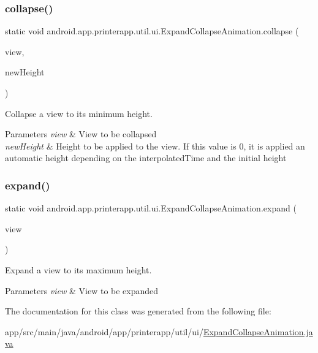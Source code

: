 \subsubsection{\texorpdfstring{collapse()}{collapse()}}
{\footnotesize\ttfamily static void android.\+app.\+printerapp.\+util.\+ui.\+Expand\+Collapse\+Animation.\+collapse (\begin{DoxyParamCaption}\item[{final View}]{view,  }\item[{final int}]{new\+Height }\end{DoxyParamCaption})\hspace{0.3cm}{\ttfamily [static]}}

Collapse a view to its minimum height.


\begin{DoxyParams}{Parameters}
{\em view} & View to be collapsed \\
\hline
{\em new\+Height} & Height to be applied to the view. If this value is 0, it is applied an automatic height depending on the interpolated\+Time and the initial height \\
\hline
\end{DoxyParams}
\mbox{\label{classandroid_1_1app_1_1printerapp_1_1util_1_1ui_1_1_expand_collapse_animation_aaff93d1476e50f6a8dc9ccce16df68e7}} 
\subsubsection{\texorpdfstring{expand()}{expand()}}
{\footnotesize\ttfamily static void android.\+app.\+printerapp.\+util.\+ui.\+Expand\+Collapse\+Animation.\+expand (\begin{DoxyParamCaption}\item[{final View}]{view }\end{DoxyParamCaption})\hspace{0.3cm}{\ttfamily [static]}}

Expand a view to its maximum height.


\begin{DoxyParams}{Parameters}
{\em view} & View to be expanded \\
\hline
\end{DoxyParams}


The documentation for this class was generated from the following file\+:\begin{DoxyCompactItemize}
\item 
app/src/main/java/android/app/printerapp/util/ui/\hyperlink{_expand_collapse_animation_8java}{Expand\+Collapse\+Animation.\+java}\end{DoxyCompactItemize}
